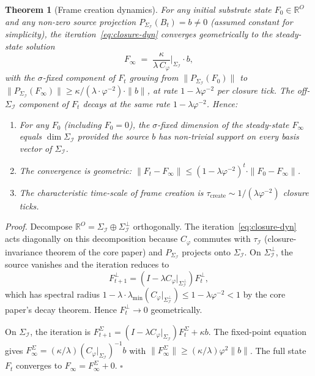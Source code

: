 \documentclass[11pt]{article}
\theoremstyle{plain}
\newtheorem{theorem}{Theorem}[section]
\theoremstyle{definition}
\theoremstyle{remark}
\newcommand{\Ical}{\mathcal{I}}
\newcommand{\Cph}{C_\varphi}
\begin{document}
\begin{theorem}[Frame creation dynamics]\label{thm:frame-creation}
For any initial substrate state $F_0 \in \mathbb{R}^O$ and any non-zero source projection $P_{\Sigma_\Ical}(B_t) = b \neq 0$ (assumed constant for simplicity), the iteration~\eqref{eq:closure-dyn} converges geometrically to the steady-state solution
\begin{equation}\label{eq:frame-steady}
  F_\infty \;=\; \frac{\kappa}{\lambda \, \Cph}\Big|_{\Sigma_\Ical} \cdot b,
\end{equation}
with the $\sigma$-fixed component of $F_t$ growing from $\|P_{\Sigma_\Ical}(F_0)\|$ to $\|P_{\Sigma_\Ical}(F_\infty)\| \geq \kappa / (\lambda \cdot \varphi^{-2}) \cdot \|b\|$, at rate $1 - \lambda \varphi^{-2}$ per closure tick. The off-$\Sigma_\Ical$ component of $F_t$ decays at the same rate $1 - \lambda \varphi^{-2}$. Hence:

\begin{enumerate}[leftmargin=2em]
\item For any $F_0$ (including $F_0 = 0$), the $\sigma$-fixed dimension of the steady-state $F_\infty$ equals $\dim \Sigma_\Ical$ provided the source $b$ has non-trivial support on every basis vector of $\Sigma_\Ical$.
\item The convergence is geometric: $\|F_t - F_\infty\| \leq (1 - \lambda \varphi^{-2})^t \cdot \|F_0 - F_\infty\|$.
\item The characteristic time-scale of frame creation is $\tau_{\mathrm{create}} \sim 1 / (\lambda \varphi^{-2})$ closure ticks.
\end{enumerate}
\end{theorem}

\noindent\emph{Proof.} Decompose $\mathbb{R}^O = \Sigma_\Ical \oplus \Sigma_\Ical^\perp$ orthogonally. The iteration~\eqref{eq:closure-dyn} acts diagonally on this decomposition because $\Cph$ commutes with $\tau_\Ical$ (closure-invariance theorem of the core paper) and $P_{\Sigma_\Ical}$ projects onto $\Sigma_\Ical$. On $\Sigma_\Ical^\perp$, the source vanishes and the iteration reduces to
\[
  F^\perp_{t+1} = (I - \lambda \Cph|_{\Sigma_\Ical^\perp}) F^\perp_t,
\]
which has spectral radius $1 - \lambda \cdot \lambda_{\min}(\Cph|_{\Sigma_\Ical^\perp}) \leq 1 - \lambda \varphi^{-2} < 1$ by the core paper's decay theorem. Hence $F^\perp_t \to 0$ geometrically.

On $\Sigma_\Ical$, the iteration is $F^\Sigma_{t+1} = (I - \lambda \Cph|_{\Sigma_\Ical}) F^\Sigma_t + \kappa b$. The fixed-point equation gives $F^\Sigma_\infty = (\kappa / \lambda) (\Cph|_{\Sigma_\Ical})^{-1} b$ with $\|F^\Sigma_\infty\| \geq (\kappa / \lambda) \varphi^{2} \|b\|$. The full state $F_t$ converges to $F_\infty = F^\Sigma_\infty + 0$. \hfill$\square$
\end{document}
